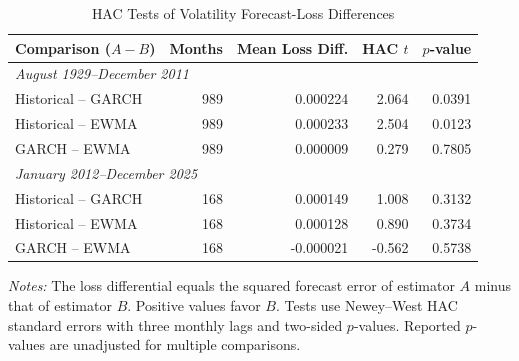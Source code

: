 
\begin{table}[htbp]
\centering
\caption{HAC Tests of Volatility Forecast-Loss Differences}
\label{tab:forecast_significance}
\small
\begin{tabular}{lrrrr}
\toprule
Comparison ($A-B$) & Months & Mean Loss Diff.
& HAC $t$ & $p$-value \\
\midrule
\multicolumn{5}{l}{\textit{August 1929--December 2011}} \\
Historical -- GARCH
    & 989 & 0.000224 & 2.064 & 0.0391 \\
Historical -- EWMA
    & 989 & 0.000233 & 2.504 & 0.0123 \\
GARCH -- EWMA
    & 989 & 0.000009 & 0.279 & 0.7805 \\
\midrule
\multicolumn{5}{l}{\textit{January 2012--December 2025}} \\
Historical -- GARCH
    & 168 & 0.000149 & 1.008 & 0.3132 \\
Historical -- EWMA
    & 168 & 0.000128 & 0.890 & 0.3734 \\
GARCH -- EWMA
    & 168 & -0.000021 & -0.562 & 0.5738 \\
\bottomrule
\end{tabular}

\vspace{0.2cm}
\begin{minipage}{0.95\textwidth}
\footnotesize
\textit{Notes:} The loss differential equals the
squared forecast error of estimator $A$ minus
that of estimator $B$. Positive values favor $B$.
Tests use Newey--West HAC standard errors with
three monthly lags and two-sided $p$-values.
Reported $p$-values are unadjusted for multiple
comparisons.
\end{minipage}
\end{table}

